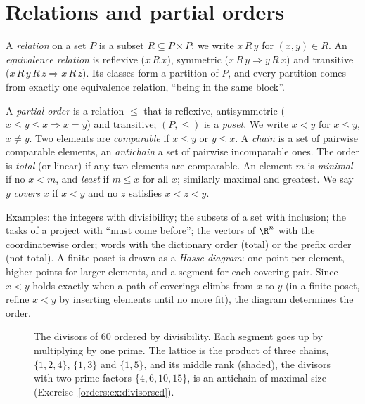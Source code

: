\section{Relations and partial orders}

A \emph{relation} on a set $P$ is a subset $R\subseteq P\times P$; we write $x\,R\,y$ for $(x,y)\in R$. An \emph{equivalence relation} is reflexive
($x\,R\,x$), symmetric ($x\,R\,y\Rightarrow y\,R\,x$) and transitive ($x\,R\,y\,R\,z\Rightarrow x\,R\,z$). Its classes form a partition of $P$, and every partition
comes from exactly one equivalence relation, ``being in the same block''.

\begin{definition}\label{orders:def:poset}
A \emph{partial order} is a relation $\le$ that is reflexive, antisymmetric ($x\le y\le x\Rightarrow x=y$) and transitive; $(P,\le)$ is a
\emph{poset}. We write $x<y$ for $x\le y$, $x\ne y$. Two elements are \emph{comparable} if $x\le y$ or $y\le x$. A \emph{chain} is a set of pairwise
comparable elements, an \emph{antichain} a set of pairwise incomparable ones. The order is \emph{total} (or linear) if any two
elements are comparable. An element $m$ is \emph{minimal} if no $x<m$, and \emph{least} if $m\le x$ for all $x$; similarly maximal and
greatest. We say $y$ \emph{covers} $x$ if $x<y$ and no $z$ satisfies $x<z<y$.
\end{definition}

Examples: the integers with divisibility; the subsets of a set with inclusion; the tasks of a project with ``must come
before''; the vectors of $\R^n$ with the coordinatewise order; words with the dictionary order (total) or the prefix order
(not total). A finite poset is drawn as a \emph{Hasse diagram}: one point per element, higher points for larger elements, and
a segment for each covering pair. Since $x<y$ holds exactly when a path of coverings climbs from $x$ to $y$ (in a finite poset,
refine $x<y$ by inserting elements until no more fit), the diagram determines the order.

\begin{figure}[ht]
\centering
{}
\caption{The divisors of $60$ ordered by divisibility. Each segment goes up by multiplying by one prime. The lattice is the
product of three chains, $\{1,2,4\}$, $\{1,3\}$ and $\{1,5\}$, and its middle rank (shaded), the divisors with two prime factors $\{4,6,10,15\}$, is an antichain of maximal size
(Exercise~\ref{orders:ex:divisorscd}).}
\label{orders:fig:divisors}
\end{figure}

